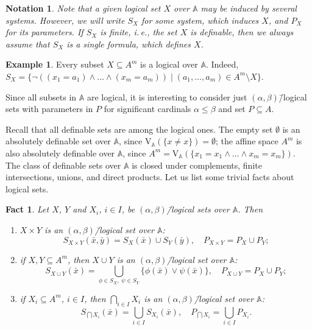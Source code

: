 \documentclass[12pt]{article}
\newtheorem{fact}{Fact}
\newtheorem{notation}{Notation}
\theoremstyle{definition}
\newtheorem{example}{Example}
\def\MA{{\mathbb{A}}}
\def\V{{\mathrm{V}}}
\begin{document}
\begin{notation}
Note that a given logical set $X$ over $\MA$ may be induced by several systems. However, we will write $S_X$ for some system, which induces $X$, and $P_X$ for its parameters. If $S_X$ is finite, i.\,e., the set $X$ is definable, then we always assume that $S_X$ is a single formula, which defines $X$. 
\end{notation}

\begin{example}\label{ex:1}
Every subset $X\subseteq A^m$ is a logical over $\MA$. Indeed,  $S_X=\{ \neg((x_1=a_1)\wedge\ldots\wedge(x_m=a_m)) \mid (a_1,\ldots,a_m)\in A^m\setminus X\}$. 
\end{example}

Since all subsets in $\MA$ are logical, it is interesting to consider just $(\alpha,\beta)$\=/logical sets with parameters in $P$ for significant cardinals $\alpha\leqslant\beta$ and set $P\subseteq A$. 

Recall that all definable sets are among the logical ones. The empty set $\emptyset$ is an absolutely definable set over $\MA$, since $\V_\MA(\{x\ne x\})=\emptyset$; the affine space $A^m$ is also absolutely definable over $\MA$, since $A^m=\V_\MA(\{x_1=x_1\wedge\ldots\wedge x_m=x_m\})$. The class of definable sets over $\MA$ is closed under complements, finite intersections, unions, and direct products. Let us list some trivial facts about logical sets.

\begin{fact}
Let $X$, $Y$ and $X_i$, $i\in I$, be $(\alpha,\beta)$\=/logical sets over $\MA$. Then
\begin{enumerate}[label=\alph*)]
\item $X\times Y$ is an $(\alpha,\beta)$\=/logical set over $\MA$: 
$$
S_{X\times Y}(\bar x,\bar y)=S_X(\bar x)\cup S_Y(\bar y),\quad P_{X\times Y}=P_X\cup P_Y;
$$
\item if $X, Y\subseteq A^m$, then $X\cup Y$ is an $(\alpha,\beta)$\=/logical set over $\MA$: 
$$
S_{X\cup Y}(\bar x)=\bigcup_{\phi\in S_X, \; \psi\in S_Y}\{\phi(\bar x)\vee\psi(\bar x)\},\quad P_{X\cup Y}=P_X\cup P_Y;
$$
\item if $X_i\subseteq A^m$, $i\in I$, then $\bigcap_{i\in I}X_i$ is an $(\alpha,\beta)$\=/logical set over $\MA$: 
$$
S_{\bigcap X_i}(\bar x)=\bigcup_{i\in I} S_{X_i}(\bar x),\quad P_{\bigcap X_i}=\bigcup_{i\in I} P_{X_i}.
$$
\end{enumerate}
\end{fact}
\end{document}
